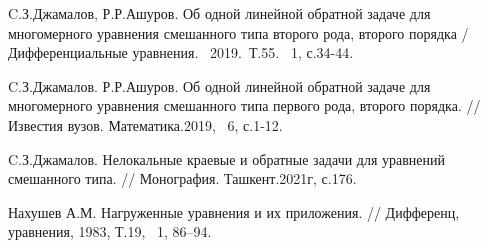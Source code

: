 \begin{thebibliography}{9} %

 C.З.Джамалов, Р.Р.Ашуров. Об одной линейной обратной задаче для многомерного уравнения смешанного типа второго рода, второго порядка / Дифференциальные уравнения. ~2019.~Т.55. \textnumero ~1, с.34-44.

 C.З.Джамалов. Р.Р.Ашуров. Об одной линейной обратной задаче для многомерного уравнения смешанного типа первого рода, второго порядка. // Известия вузов. Математика.2019, \textnumero ~6, с.1-12.

 C.З.Джамалов. Нелокальные краевые и обратные задачи для уравнений смешанного типа. // Монография. Ташкент.2021г, с.176.

 Нахушев А.М. Нагруженные уравнения и их приложения. // Дифференц, уравнения, 1983,  Т.19, \textnumero ~1, 86–94.





\end{thebibliography}




%

